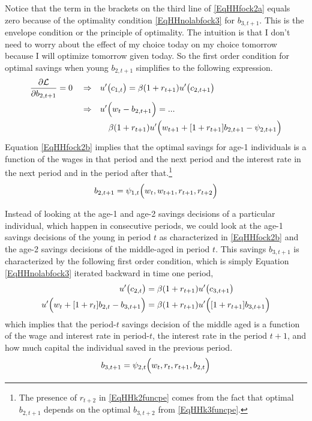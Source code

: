 \documentclass[letterpaper,12pt]{article}
\theoremstyle{definition}
\numberwithin{equation}{section}
\numberwithin{exercise}{section}
\begin{document}
\begin{spacing}{1.5}
      Notice that the term in the brackets on the third line of \eqref{EqHHfock2a} equals zero because of the optimality condition \eqref{EqHHnolabfock3} for $b_{3,t+1}$. This is the envelope condition or the principle of optimality. The intuition is that I don't need to worry about the effect of my choice today on my choice tomorrow because I will optimize tomorrow given today. So the first order condition for optimal savings when young $b_{2,t+1}$ simplifies to the following expression.
      \begin{equation}\label{EqHHfock2b}
         \begin{split}
            \frac{\partial\mathcal{L}}{\partial b_{2,t+1}} = 0 \quad\Rightarrow\quad &u'\bigl(c_{1,t}\bigr) = \beta(1 + r_{t+1})u'\bigl(c_{2,t+1}\bigr) \\
            \Rightarrow\quad &u'\Bigl(w_{t} - b_{2,t+1}\Bigr) = ... \\
            &\quad \beta(1 + r_{t+1})u'\Bigl(w_{t+1} + [1 + r_{t+1}]b_{2,t+1} - \psi_{2,t+1}\Bigr)
         \end{split}
      \end{equation}
      Equation \eqref{EqHHfock2b} implies that the optimal savings for age-1 individuals is a function of the wages in that period and the next period and the interest rate in the next period and in the period after that.\footnote{The presence of $r_{t+2}$ in \eqref{EqHHk2funcpe} comes from the fact that optimal $b_{2,t+1}$ depends on the optimal $b_{3,t+2}$ from \eqref{EqHHk3funcpe}.}
      \begin{equation}\label{EqHHk2funcpe}
         b_{2,t+1} = \psi_{1,t}\Bigl(w_t,w_{t+1},r_{t+1},r_{t+2}\Bigr)
      \end{equation}

      Instead of looking at the age-1 and age-2 savings decisions of a particular individual, which happen in consecutive periods, we could look at the age-1 savings decisions of the young in period $t$ as characterized in \eqref{EqHHfock2b} and the age-2 savings decisions of the middle-aged in period $t$. This savings $b_{3,t+1}$ is characterized by the following first order condition, which is simply Equation \eqref{EqHHnolabfock3} iterated backward in time one period,
      \begin{equation}\label{EqHHnolabfock3b}
         \begin{split}
            u'\bigl(c_{2,t}\bigr) &= \beta(1+r_{t+1})u'\bigl(c_{3,t+1}\bigr) \\
            u'\Bigl(w_t + [1 + r_t]b_{2,t} - b_{3,t+1}\Bigr) &= \beta(1 + r_{t+1})u'\Bigl([1 + r_{t+1}]b_{3,t+1}\Bigr)
         \end{split}
      \end{equation}
      which implies that the period-$t$ savings decision of the middle aged is a function of the wage and interest rate in period-$t$, the interest rate in the period $t+1$, and how much capital the individual saved in the previous period.
      \begin{equation}\label{EqHHk3funcpeb}
         b_{3,t+1} = \psi_{2,t}\Bigl(w_{t},r_{t},r_{t+1},b_{2,t}\Bigr)
      \end{equation}


\end{spacing}
\end{document}
